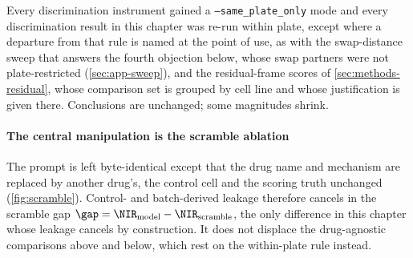 \begin{scopelimit}
Every discrimination instrument gained a \texttt{--same\_plate\_only} mode and
every discrimination result in this chapter was re-run within plate, except
where a departure from that rule is named at the point of use, as with the
swap-distance sweep that answers the fourth objection below, whose swap partners
were not plate-restricted (\cref{sec:app-sweep}), and the residual-frame scores
of \cref{sec:methods-residual}, whose comparison set is grouped by cell line and
whose justification is given there. Conclusions are unchanged; some magnitudes
shrink.
\end{scopelimit}

\paragraph{The central manipulation is the scramble ablation} The prompt is left
byte-identical except that the drug name and mechanism are replaced by another
drug's, the control cell and the scoring truth unchanged
(\cref{fig:scramble}). Control- and batch-derived leakage therefore cancels in
the scramble gap $\gap = \NIR_{\textrm{model}} - \NIR_{\textrm{scramble}}$, the
only difference in this chapter whose leakage cancels by construction. It does
not displace the drug-agnostic comparisons above and below, which rest on the
within-plate rule instead.

%
%


